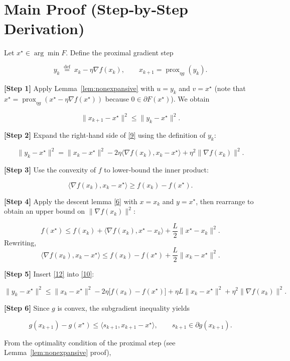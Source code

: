 \documentclass{article}
\newcommand{\prox}{\operatorname{prox}}
\begin{document}
\section*{Main Proof (Step‑by‑Step Derivation)}
Let $x^{\star}\in\arg\min F$.  Define the proximal gradient step  

\[
y_{k}\;\stackrel{\text{def}}{=}\;x_{k}-\eta\nabla f(x_{k}),\qquad
x_{k+1}= \prox_{\eta g}(y_{k}). \tag{8}
\]

\noindent\textbf{[Step 1]} Apply Lemma~\ref{lem:nonexpansive} with $u=y_{k}$ and $v=x^{\star}$ (note that $x^{\star}= \prox_{\eta g}(x^{\star}-\eta\nabla f(x^{\star}) )$ because $0\in\partial F(x^{\star})$). We obtain  

\[
\|x_{k+1}-x^{\star}\|^{2}\le\|y_{k}-x^{\star}\|^{2}. \tag{9}
\]

\noindent\textbf{[Step 2]} Expand the right‑hand side of \eqref{9} using the definition of $y_{k}$:

\[
\|y_{k}-x^{\star}\|^{2}
=\|x_{k}-x^{\star}\|^{2}
-2\eta\langle\nabla f(x_{k}),x_{k}-x^{\star}\rangle
+\eta^{2}\|\nabla f(x_{k})\|^{2}. \tag{10}
\]

\noindent\textbf{[Step 3]} Use the convexity of $f$ to lower‑bound the inner product:

\[
\langle\nabla f(x_{k}),x_{k}-x^{\star}\rangle
\ge f(x_{k})-f(x^{\star}). \tag{11}
\]

\noindent\textbf{[Step 4]} Apply the descent lemma \eqref{6} with $x=x_{k}$ and $y=x^{\star}$, then rearrange to obtain an upper bound on $\|\nabla f(x_{k})\|^{2}$:

\[
f(x^{\star})\le f(x_{k})+\langle\nabla f(x_{k}),x^{\star}-x_{k}\rangle+\frac{L}{2}\|x^{\star}-x_{k}\|^{2}.
\]
Rewriting,
\[
\langle\nabla f(x_{k}),x_{k}-x^{\star}\rangle\le f(x_{k})-f(x^{\star})+\frac{L}{2}\|x_{k}-x^{\star}\|^{2}. \tag{12}
\]

\noindent\textbf{[Step 5]} Insert \eqref{12} into \eqref{10}:

\[
\|y_{k}-x^{\star}\|^{2}
\le\|x_{k}-x^{\star}\|^{2}
-2\eta\bigl[f(x_{k})-f(x^{\star})\bigr]
+\eta L\|x_{k}-x^{\star}\|^{2}
+\eta^{2}\|\nabla f(x_{k})\|^{2}. \tag{13}
\]

\noindent\textbf{[Step 6]} Since $g$ is convex, the subgradient inequality yields  

\[
g(x_{k+1})-g(x^{\star})\le \langle s_{k+1},x_{k+1}-x^{\star}\rangle,
\qquad s_{k+1}\in\partial g(x_{k+1}). \tag{14}
\]

From the optimality condition of the proximal step (see Lemma~\ref{lem:nonexpansive} proof),
\end{document}
